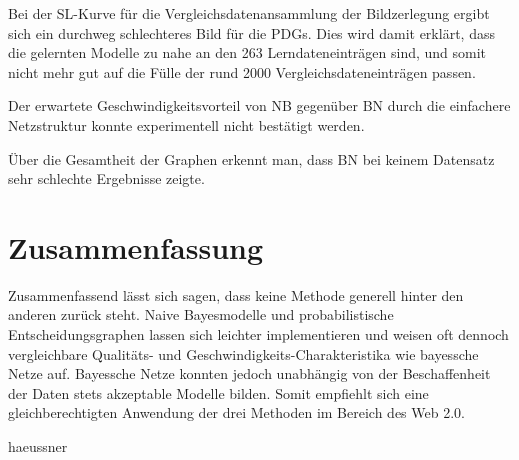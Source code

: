 \documentclass{llncs}
\begin{document}
Bei der SL-Kurve für die Vergleichsdatenansammlung der Bildzerlegung ergibt sich ein durchweg schlechteres Bild für die PDGs. Dies wird damit erklärt, dass die gelernten Modelle zu nahe an den 263 Lerndateneinträgen sind, und somit nicht mehr gut auf die Fülle der rund 2000 Vergleichsdateneinträgen passen. 

Der erwartete Geschwindigkeitsvorteil von NB gegenüber BN durch die einfachere Netzstruktur konnte experimentell nicht bestätigt werden. 

Über die Gesamtheit der Graphen erkennt man, dass BN bei keinem Datensatz sehr schlechte Ergebnisse zeigte. 

\section{Zusammenfassung}

Zusammenfassend lässt sich sagen, dass keine Methode generell hinter den anderen zurück steht. Naive Bayesmodelle und probabilistische Entscheidungsgraphen lassen sich leichter implementieren und weisen oft dennoch vergleichbare Qualitäts- und Geschwindigkeits-Charakteristika wie bayessche Netze auf. Bayessche Netze konnten jedoch unabhängig von der Beschaffenheit der Daten stets akzeptable Modelle bilden. Somit empfiehlt sich eine gleichberechtigten Anwendung der drei Methoden im Bereich des Web 2.0. 

 {haeussner}

\end{document}
